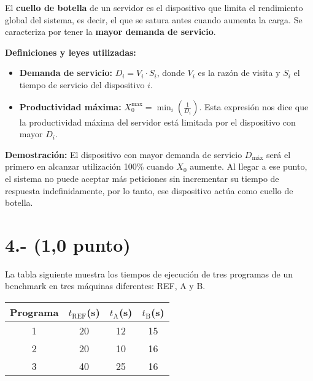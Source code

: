 \documentclass[a4paper,12pt]{article}
\begin{document}
\begin{enumerate}
    El \textbf{cuello de botella} de un servidor es el dispositivo que limita el rendimiento global del sistema, es decir, el que se satura antes cuando aumenta la carga. Se caracteriza por tener la \textbf{mayor demanda de servicio}.

    \textbf{Definiciones y leyes utilizadas:}
    \begin{itemize}
        \item \textbf{Demanda de servicio:} $D_i = V_i \cdot S_i$, donde $V_i$ es la razón de visita y $S_i$ el tiempo de servicio del dispositivo $i$.
        \item \textbf{Productividad máxima:} $X_0^{\text{max}} = \min_i \left( \frac{1}{D_i} \right)$. Esta expresión nos dice que la productividad máxima del servidor está limitada por el dispositivo con mayor $D_i$.
    \end{itemize}

    \textbf{Demostración:} El dispositivo con mayor demanda de servicio $D_{\text{máx}}$ será el primero en alcanzar utilización 100\% cuando $X_0$ aumente. Al llegar a ese punto, el sistema no puede aceptar más peticiones sin incrementar su tiempo de respuesta indefinidamente, por lo tanto, ese dispositivo actúa como cuello de botella.

\end{enumerate}


\section*{4.- (1,0 punto)}
La tabla siguiente muestra los tiempos de ejecución de tres programas de un benchmark en tres máquinas diferentes: REF, A y B.

\begin{center}
\begin{tabular}{|c|c|c|c|}
\hline
Programa & $t_{\text{REF}}$(s) & $t_{\text{A}}$(s) & $t_{\text{B}}$(s) \\
\hline
1 & 20 & 12 & 15 \\
2 & 20 & 10 & 16 \\
3 & 40 & 25 & 16 \\
\hline
\end{tabular}
\end{center}
\end{document}
